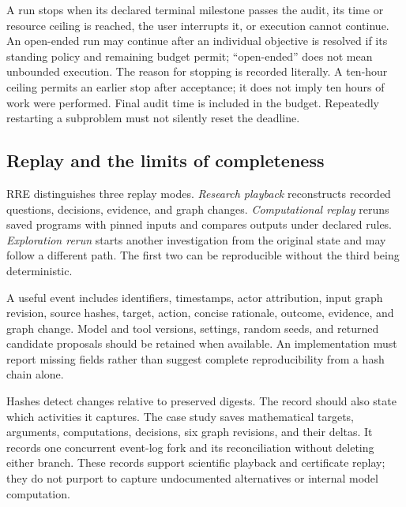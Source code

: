A run stops when its declared terminal milestone passes the audit, its time or resource ceiling is reached, the user interrupts it, or execution cannot continue. An open-ended run may continue after an individual objective is resolved if its standing policy and remaining budget permit; ``open-ended'' does not mean unbounded execution. The reason for stopping is recorded literally. A ten-hour ceiling permits an earlier stop after acceptance; it does not imply ten hours of work were performed. Final audit time is included in the budget. Repeatedly restarting a subproblem must not silently reset the deadline.

\subsection{Replay and the limits of completeness}

RRE distinguishes three replay modes. \emph{Research playback} reconstructs recorded questions, decisions, evidence, and graph changes. \emph{Computational replay} reruns saved programs with pinned inputs and compares outputs under declared rules. \emph{Exploration rerun} starts another investigation from the original state and may follow a different path. The first two can be reproducible without the third being deterministic.

A useful event includes identifiers, timestamps, actor attribution, input graph revision, source hashes, target, action, concise rationale, outcome, evidence, and graph change. Model and tool versions, settings, random seeds, and returned candidate proposals should be retained when available. An implementation must report missing fields rather than suggest complete reproducibility from a hash chain alone.

Hashes detect changes relative to preserved digests. The record should also state which activities it captures. The case study saves mathematical targets, arguments, computations, decisions, six graph revisions, and their deltas. It records one concurrent event-log fork and its reconciliation without deleting either branch. These records support scientific playback and certificate replay; they do not purport to capture undocumented alternatives or internal model computation.
